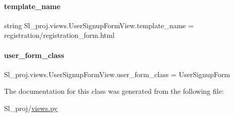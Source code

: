 \paragraph{\texorpdfstring{template\+\_\+name}{template\_name}}
{\footnotesize\ttfamily string Sl\+\_\+proj.\+views.\+User\+Signup\+Form\+View.\+template\+\_\+name = \textquotesingle{}registration/registration\+\_\+form.\+html\textquotesingle{}\hspace{0.3cm}{\ttfamily [static]}}

\mbox{\label{classSl__proj_1_1views_1_1UserSignupFormView_aecdb5a06ba11aeb68ebde787575bb26d}} 
\paragraph{\texorpdfstring{user\+\_\+form\+\_\+class}{user\_form\_class}}
{\footnotesize\ttfamily Sl\+\_\+proj.\+views.\+User\+Signup\+Form\+View.\+user\+\_\+form\+\_\+class = User\+Signup\+Form\hspace{0.3cm}{\ttfamily [static]}}



The documentation for this class was generated from the following file\+:\begin{DoxyCompactItemize}
\item 
Sl\+\_\+proj/\hyperlink{Sl__proj_2views_8py}{views.\+py}\end{DoxyCompactItemize}
